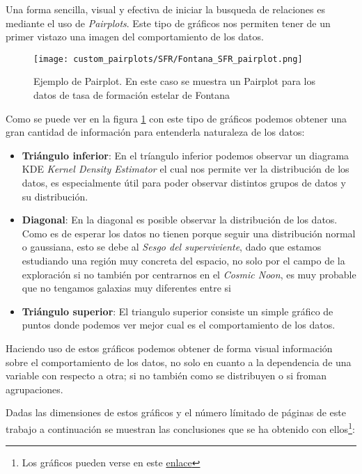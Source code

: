 \documentclass[11pt, a4paper]{article} %
\begin{document}
Una forma sencilla, visual y efectiva de iniciar la busqueda de relaciones es mediante el uso de \textit{Pairplots}. Este tipo de gráficos nos permiten tener de un primer vistazo una imagen del comportamiento de los datos. 

\begin{figure}[H]
    \centering
    \texttt{[image: custom\_pairplots/SFR/Fontana\_SFR\_pairplot.png]}
    \caption{Ejemplo de Pairplot. En este caso se muestra un Pairplot para los datos de tasa de formación estelar de Fontana}
    \label{fig:pair_ex}
\end{figure}

Como se puede ver en la figura \ref{fig:pair_ex} con este tipo de gráficos podemos obtener una gran cantidad de información para entenderla naturaleza de los datos:

\begin{itemize}
    \item \textbf{Triángulo inferior}: En el tríangulo inferior podemos observar un diagrama KDE \textit{Kernel Density Estimator} el cual nos 
    permite ver la distribución de los datos, es especialmente útil para poder observar distintos grupos de datos y su distribución.
    \item \textbf{Diagonal}: En la diagonal es posible observar la distribución de los datos. Como es de esperar los datos no tienen porque seguir una distribución normal o gaussiana, esto se debe al \textit{Sesgo del superviviente}, dado que estamos estudiando
     una región muy concreta del espacio, no solo por el campo de la exploración si no también por centrarnos en el \textit{Cosmic Noon}, es muy probable que no tengamos galaxias muy diferentes entre si
    \item \textbf{Triángulo superior}: El triangulo superior consiste un simple gráfico de puntos donde podemos ver mejor cual es el comportamiento de los datos.
    
\end{itemize}

Haciendo uso de estos gráficos podemos obtener de forma visual información sobre el comportamiento de los datos, no solo en cuanto a la dependencia de una variable con respecto a otra; si no 
también como se distribuyen o si froman agrupaciones. 

Dadas las dimensiones de estos gráficos y el número límitado de páginas de este trabajo a continuación se muestran las conclusiones que se ha obtenido con ellos\footnote{Los gráficos pueden verse en este \href{https://github.com/PhyAMR/TFG/tree/main/custom_pairplots}{enlace}}:
\end{document}
